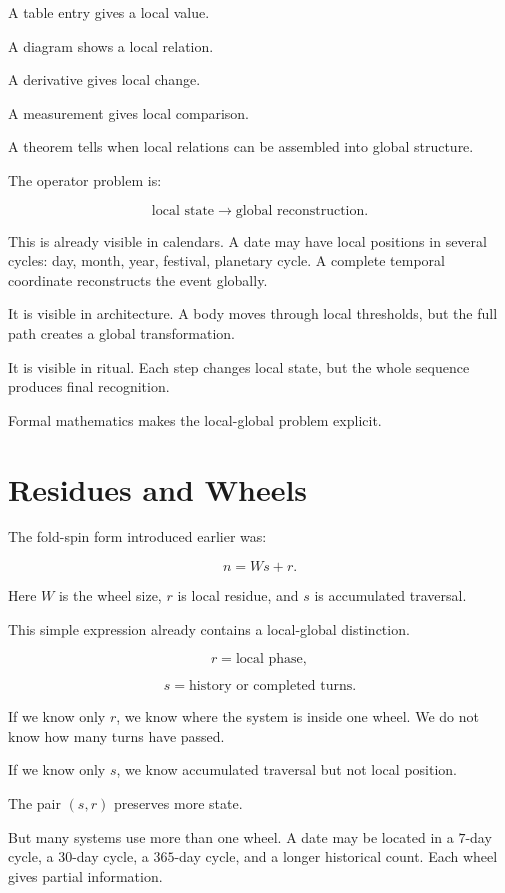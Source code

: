 \documentclass[11pt]{book}
\begin{document}
A table entry gives a local value.

A diagram shows a local relation.

A derivative gives local change.

A measurement gives local comparison.

A theorem tells when local relations can be assembled into global structure.

The operator problem is:

\[
\text{local state} \rightarrow \text{global reconstruction}.
\]

This is already visible in calendars. A date may have local positions in several cycles: day, month, year, festival, planetary cycle. A complete temporal coordinate reconstructs the event globally.

It is visible in architecture. A body moves through local thresholds, but the full path creates a global transformation.

It is visible in ritual. Each step changes local state, but the whole sequence produces final recognition.

Formal mathematics makes the local-global problem explicit.

\section{Residues and Wheels}

The fold-spin form introduced earlier was:

\[
n = Ws + r.
\]

Here \(W\) is the wheel size, \(r\) is local residue, and \(s\) is accumulated traversal.

This simple expression already contains a local-global distinction.

\[
r = \text{local phase},
\]

\[
s = \text{history or completed turns}.
\]

If we know only \(r\), we know where the system is inside one wheel. We do not know how many turns have passed.

If we know only \(s\), we know accumulated traversal but not local position.

The pair \((s,r)\) preserves more state.

But many systems use more than one wheel. A date may be located in a \(7\)-day cycle, a \(30\)-day cycle, a \(365\)-day cycle, and a longer historical count. Each wheel gives partial information.
\end{document}
